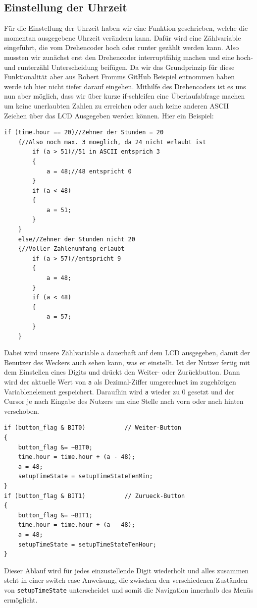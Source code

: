 \documentclass[openright,twoside,11pt,a4paper]{scrartcl}
\begin{document}
\begin{flushleft}
		 \subsection{Einstellung der Uhrzeit}
	 	Für die Einstellung der Uhrzeit haben wir eine Funktion geschrieben, welche die momentan ausgegebene Uhrzeit verändern kann. Dafür wird eine Zählvariable eingeführt, die vom Drehencoder hoch oder runter gezählt werden kann. Also mussten wir zunächst erst den Drehencoder interruptfähig machen und eine hoch- und runterzähl Unterscheidung beifügen. Da wir das Grundprinzip für diese Funktionalität aber aus Robert Fromms GitHub Beispiel entnommen haben werde ich hier nicht tiefer darauf eingehen. Mithilfe des Drehencoders ist es uns nun aber möglich, dass wir über kurze if-schleifen eine Überlaufabfrage machen um keine unerlaubten Zahlen zu erreichen oder auch keine anderen ASCII Zeichen über das LCD Ausgegeben werden können. Hier ein Beispiel:
	 	\begin{lstlisting}
if (time.hour == 20)//Zehner der Stunden = 20
	{//Also noch max. 3 moeglich, da 24 nicht erlaubt ist
		if (a > 51)//51 in ASCII entsprich 3
		{
			a = 48;//48 entspricht 0
		}
		if (a < 48)
		{
			a = 51;
		}
	}
	else//Zehner der Stunden nicht 20
	{//Voller Zahlenumfang erlaubt
		if (a > 57)//entspricht 9
		{
			a = 48;
		}
		if (a < 48)
		{
			a = 57;
		}
	}
	 	\end{lstlisting}
	 	Dabei wird unsere Zählvariable a dauerhaft auf dem LCD ausgegeben, damit der Benutzer des Weckers auch sehen kann, was er einstellt. Ist der Nutzer fertig mit dem Einstellen eines Digits und drückt den Weiter- oder Zurückbutton. Dann wird der aktuelle Wert von \lstinline[language=c++]|a| als Dezimal-Ziffer umgerechnet im zugehörigen Variablenelement gespeichert. Daraufhin wird \lstinline[language=c++]|a| wieder zu 0 gesetzt und der Cursor je nach Eingabe des Nutzers um eine Stelle nach vorn oder nach hinten verschoben.
	 	\begin{lstlisting}
if (button_flag & BIT0)           // Weiter-Button
{
	button_flag &= ~BIT0;
	time.hour = time.hour + (a - 48);
	a = 48;
	setupTimeState = setupTimeStateTenMin;
}
if (button_flag & BIT1)           // Zurueck-Button
{
	button_flag &= ~BIT1;
	time.hour = time.hour + (a - 48);
	a = 48;
	setupTimeState = setupTimeStateTenHour;
}
	 	\end{lstlisting}
	 	Dieser Ablauf wird für jedes einzustellende Digit wiederholt und alles zusammen steht in einer switch-case Anweisung, die zwischen den verschiedenen Zuständen von \lstinline[language=c++]|setupTimeState| unterscheidet und somit die Navigation innerhalb des Menüs ermöglicht. \\

\end{flushleft}
\end{document}
